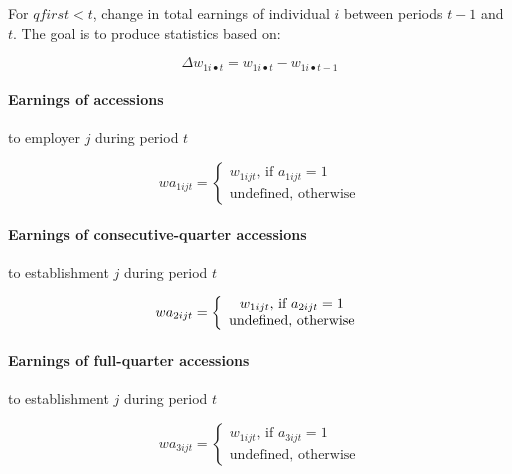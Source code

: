 For $qfirst < t$, change in total earnings of individual $i$ between periods 
$t - 1$ and $t$. The goal is to produce statistics based on:

\begin{equation}
\Delta w_{1i\bullet t} = w_{1i\bullet t} - w_{1i\bullet t - 1}
\end{equation}

\paragraph{Earnings of accessions}

to employer $j$ during period $t$

\begin{equation}
wa_{1ijt} = \left\{ 
\begin{array}{l}
{w_{1ijt} \mbox{, if }a_{1ijt} = 1} \\ 
{\mbox{undefined, otherwise}}%
\end{array}%
\right.
\end{equation}

\paragraph{Earnings of consecutive-quarter accessions}

 

to establishment $j$ during period $t$

\begin{equation}
wa_{2ijt} = \left\{ \begin{array}{*{20}c} {w_{1ijt} \mbox{, if }a_{2ijt} =
1} \\ {\mbox{undefined, otherwise}} \\ \end{array}\right.
\end{equation}

\paragraph{Earnings of full-quarter accessions}

 

to establishment $j$ during period $t$

\begin{equation}
wa_{3ijt} = \left\{ 
\begin{array}{l}
{w_{1ijt} \mbox{, if }a_{3ijt} = 1} \\ 
{\mbox{undefined, otherwise}}%
\end{array}%
\right.
\end{equation}

